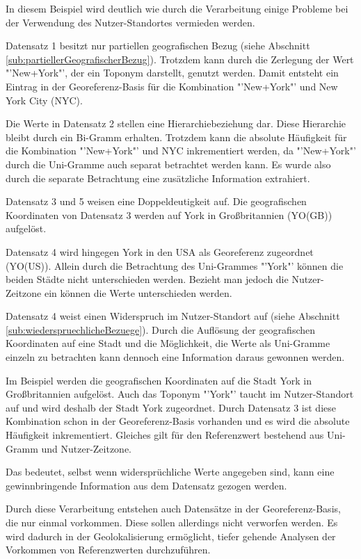 			In diesem Beispiel wird deutlich wie durch die Verarbeitung einige Probleme bei der Verwendung des Nutzer-Standortes vermieden werden.

			Datensatz 1 besitzt nur partiellen geografischen Bezug (siehe Abschnitt \ref{sub:partiellerGeografischerBezug}). 
			Trotzdem kann durch die Zerlegung der Wert "'New+York"', der ein Toponym darstellt, genutzt werden.
			Damit entsteht ein Eintrag in der Georeferenz-Basis für die Kombination "'New+York"' und New York City (NYC).

			Die Werte in Datensatz 2 stellen eine Hierarchiebeziehung dar.
			Diese Hierarchie bleibt durch ein Bi-Gramm erhalten.
			Trotzdem kann die absolute Häufigkeit für die Kombination "'New+York"' und NYC inkrementiert werden, da "'New+York"' durch die Uni-Gramme auch separat betrachtet werden kann.
			Es wurde also durch die separate Betrachtung eine zusätzliche Information extrahiert.

			Datensatz 3 und 5 weisen eine Doppeldeutigkeit auf.
			Die geografischen Koordinaten von Datensatz 3 werden auf York in Großbritannien (YO(GB)) aufgelöst.
			
			Datensatz 4 wird hingegen York in den USA als Georeferenz zugeordnet (YO(US)). 
			Allein durch die Betrachtung des Uni-Grammes "'York"' können die beiden Städte nicht unterschieden werden. 
			Bezieht man jedoch die Nutzer-Zeitzone ein können die Werte unterschieden werden. 

			Datensatz 4 weist einen Widerspruch im Nutzer-Standort auf (siehe Abschnitt \ref{sub:wiederspruechlicheBezuege}). 
			Durch die Auflösung der geografischen Koordinaten auf eine Stadt und die Möglichkeit, die Werte als Uni-Gramme einzeln zu betrachten kann dennoch eine Information daraus gewonnen werden. 
			
			Im Beispiel werden die geografischen Koordinaten auf die Stadt York in Großbritannien aufgelöst.
			Auch das Toponym "'York"' taucht im Nutzer-Standort auf und wird deshalb der Stadt York zugeordnet.  
			Durch Datensatz 3 ist diese Kombination schon in der Georeferenz-Basis vorhanden und es wird die absolute Häufigkeit inkrementiert.
			Gleiches gilt für den Referenzwert bestehend aus Uni-Gramm und Nutzer-Zeitzone.
			
			Das bedeutet, selbst wenn widersprüchliche Werte angegeben sind, kann eine gewinnbringende Information aus dem Datensatz gezogen werden.

			Durch diese Verarbeitung entstehen auch Datensätze in der Georeferenz-Basis, die nur einmal vorkommen.
			Diese sollen allerdings nicht verworfen werden. 
			Es wird dadurch in der Geolokalisierung ermöglicht, tiefer gehende Analysen der Vorkommen von Referenzwerten durchzuführen. 

